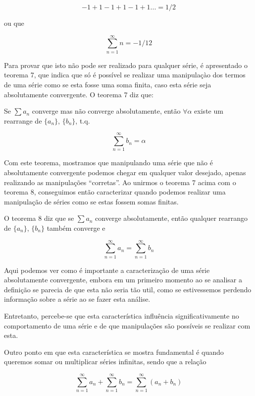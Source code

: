 \documentclass[a4paper, 12pt]{article}
\begin{document}
\begin{equation}
 \nonumber -1 + 1 -1 + 1 - 1 + 1 ... = 1/2
\end{equation}

ou que 

\begin{equation}
 \nonumber \sum_{n=1}^\infty n = -1/12
\end{equation}

Para provar que isto não pode ser realizado para qualquer série, é apresentado o teorema 7,
que indica que só é possível se realizar uma manipulaçào dos termos de uma série como se esta
fosse uma soma finita, caso esta série seja absolutamente convergente. O teorema 7 diz que:

Se $\sum a_n$ converge mas não converge absolutamente, então $\forall \alpha$ existe um rearrange
de $\{a_n\}$, $\{b_n\}$, t.q.

\begin{equation}
 \nonumber \sum_{n=1}^\infty b_n = \alpha
\end{equation}

Com este teorema, mostramos que manipulando uma série que não é absolutamente convergente
podemos chegar em qualquer valor desejado, apenas realizando as manipulações ``corretas''. 
Ao unirmos o teorema 7 acima com o teorema 8, conseguimos então caracterizar quando podemos 
realizar uma manipulação de séries como se estas fossem somas finitas.

O teorema 8 diz que se $\sum a_n$ converge absolutamente, então qualquer rearrango
de $\{a_n\}$, $\{b_n\}$ também converge e 

\begin{equation}
 \nonumber \sum_{n=1}^\infty a_n = \sum_{n=1}^\infty b_n 
\end{equation}

Aqui podemos ver como é importante a caracterização de uma série absolutamente convergente,
embora em um primeiro momento ao se analisar a definição se parecia de que esta não seria tão util,
como se estivessemos perdendo informação sobre a série ao se fazer esta análise.

Entretanto, percebe-se que esta característica influência significativamente no comportamento de uma série
e de que manipulações são possíveis se realizar com esta.

Outro ponto em que esta característica se mostra fundamental é quando queremos somar ou multiplicar
séries infinitas, sendo que a relação

\begin{equation}
 \nonumber \sum_{n=1}^\infty a_n + \sum_{n=1}^\infty b_n  = \sum_{n=1}^\infty (a_n + b_n)  
\end{equation}
\end{document}
